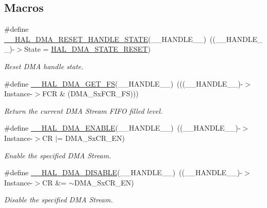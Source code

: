 \subsection*{Macros}
\begin{DoxyCompactItemize}
\item 
\#define \mbox{\hyperlink{group___d_m_a_gaadcee34f0999c8eafd37de2f69daa0ac}{\+\_\+\+\_\+\+H\+A\+L\+\_\+\+D\+M\+A\+\_\+\+R\+E\+S\+E\+T\+\_\+\+H\+A\+N\+D\+L\+E\+\_\+\+S\+T\+A\+TE}}(\+\_\+\+\_\+\+H\+A\+N\+D\+L\+E\+\_\+\+\_\+)~((\+\_\+\+\_\+\+H\+A\+N\+D\+L\+E\+\_\+\+\_\+)-\/$>$State = \mbox{\hyperlink{group___d_m_a___exported___types_gga9c012af359987a240826f29073bbe463a9e7be73da32b8c837cde0318e0d5eed2}{H\+A\+L\+\_\+\+D\+M\+A\+\_\+\+S\+T\+A\+T\+E\+\_\+\+R\+E\+S\+ET}})
\begin{DoxyCompactList}\small\item\em Reset D\+MA handle state. \end{DoxyCompactList}\item 
\#define \mbox{\hyperlink{group___d_m_a_ga8f0ff408d25904040b9d23ee7f6af080}{\+\_\+\+\_\+\+H\+A\+L\+\_\+\+D\+M\+A\+\_\+\+G\+E\+T\+\_\+\+FS}}(\+\_\+\+\_\+\+H\+A\+N\+D\+L\+E\+\_\+\+\_\+)~(((\+\_\+\+\_\+\+H\+A\+N\+D\+L\+E\+\_\+\+\_\+)-\/$>$Instance-\/$>$F\+CR \& (D\+M\+A\+\_\+\+Sx\+F\+C\+R\+\_\+\+FS)))
\begin{DoxyCompactList}\small\item\em Return the current D\+MA Stream F\+I\+FO filled level. \end{DoxyCompactList}\item 
\#define \mbox{\hyperlink{group___d_m_a_ga93900b3ef3f87ef924eb887279a434b4}{\+\_\+\+\_\+\+H\+A\+L\+\_\+\+D\+M\+A\+\_\+\+E\+N\+A\+B\+LE}}(\+\_\+\+\_\+\+H\+A\+N\+D\+L\+E\+\_\+\+\_\+)~((\+\_\+\+\_\+\+H\+A\+N\+D\+L\+E\+\_\+\+\_\+)-\/$>$Instance-\/$>$CR $\vert$=  D\+M\+A\+\_\+\+Sx\+C\+R\+\_\+\+EN)
\begin{DoxyCompactList}\small\item\em Enable the specified D\+MA Stream. \end{DoxyCompactList}\item 
\#define \mbox{\hyperlink{group___d_m_a_gafeef4c5e8c3f015cdecc0f37bbe063dc}{\+\_\+\+\_\+\+H\+A\+L\+\_\+\+D\+M\+A\+\_\+\+D\+I\+S\+A\+B\+LE}}(\+\_\+\+\_\+\+H\+A\+N\+D\+L\+E\+\_\+\+\_\+)~((\+\_\+\+\_\+\+H\+A\+N\+D\+L\+E\+\_\+\+\_\+)-\/$>$Instance-\/$>$CR \&=  $\sim$D\+M\+A\+\_\+\+Sx\+C\+R\+\_\+\+EN)
\begin{DoxyCompactList}\small\item\em Disable the specified D\+MA Stream. \end{DoxyCompactList}\item 

\end{DoxyCompactItemize}
